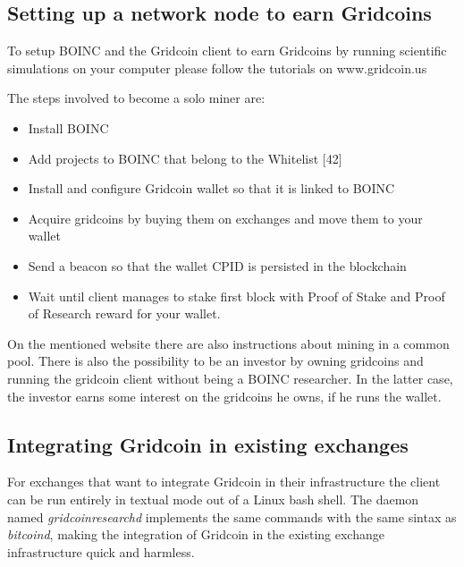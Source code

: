 \subsection{Setting up a network node to earn Gridcoins}

To setup BOINC and the Gridcoin client to earn Gridcoins by running scientific simulations on your computer please follow the tutorials on www.gridcoin.us

The steps involved to become a solo miner are:
\begin{itemize}
  \item Install BOINC
  \item Add projects to BOINC that belong to the Whitelist [42]
  \item Install and configure Gridcoin wallet so that it is linked to BOINC 
  \item Acquire gridcoins by buying them on exchanges and move them to your wallet
  \item Send a beacon so that the wallet CPID is persisted in the blockchain
  \item Wait until client manages to stake first block with Proof of Stake and Proof of Research reward for your wallet.
\end{itemize}

On the mentioned website there are also instructions about mining in a common pool. There is also the possibility to be an investor by owning gridcoins and running the gridcoin client without being a BOINC researcher. In the latter case, the investor earns some interest on the gridcoins he owns, if he runs the wallet.\\

\subsection{Integrating Gridcoin in existing exchanges}

For exchanges that want to integrate Gridcoin in their infrastructure the client can be run entirely in textual mode out of a Linux bash shell. The daemon named \textit{gridcoinresearchd} implements the same commands with the same sintax as \textit{bitcoind}, making the integration of Gridcoin in the existing exchange infrastructure quick and harmless.\\